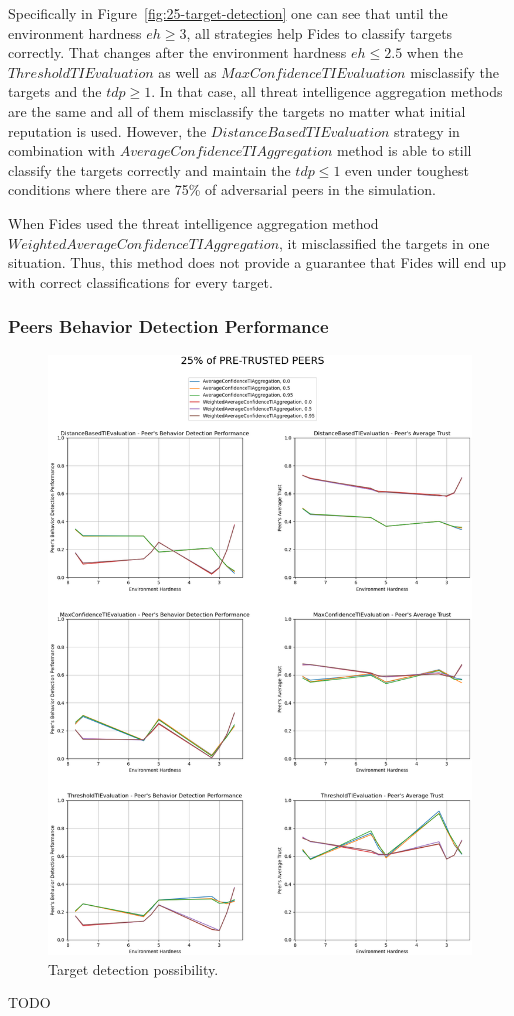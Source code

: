 Specifically in Figure~\ref{fig:25-target-detection} one can see that until the environment hardness $eh \geq 3$, all strategies help Fides to classify targets correctly.
That changes after the environment hardness $eh \leq 2.5$ when the $ThresholdTIEvaluation$ as well as $MaxConfidenceTIEvaluation$ misclassify the targets and the $tdp \geq 1$. In that case, all threat intelligence aggregation methods are the same and all of them misclassify the targets no matter what initial reputation is used.
However, the $DistanceBasedTIEvaluation$ strategy in combination with $AverageConfidenceTIAggregation$ method is able to still classify the targets correctly and maintain the $tdp \leq 1$ even under toughest conditions where there are 75\% of adversarial peers in the simulation.

When Fides used the threat intelligence aggregation method $WeightedAverageConfidenceTIAggregation$, it misclassified the targets in one situation.
Thus, this method does not provide a guarantee that Fides will end up with correct classifications for every target.


\cleartoleftpage
\subsubsection{Peers Behavior Detection Performance}

\begin{figure}[hp]
    \centering
    \includegraphics[width=1.0\textwidth]{assets/25_peer_trust.png}
    \caption{Target detection possibility.}
    \label{fig:25-peer-trust}
\end{figure}

TODO